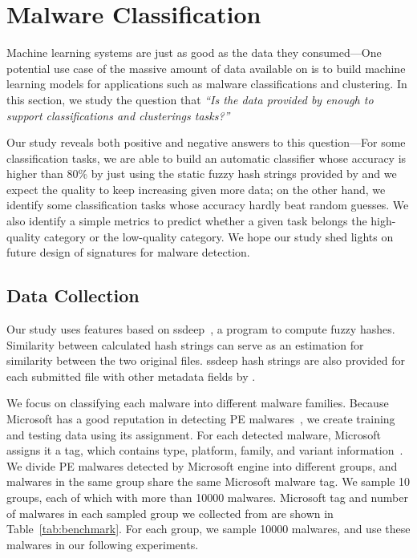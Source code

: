 \section{Malware Classification}
\label{sec:ssdeep}

Machine learning systems are just as good
as the data they consumed---One potential 
use case of the massive amount of data 
available on \vt{} is to build 
machine learning models for applications
such as malware classifications and
clustering. In this section, we study
the question that {\em ``Is the data
provided by \vt{} enough to support
classifications and clusterings tasks?''}

Our study reveals both positive and
negative answers to this question---For
some classification tasks, we are able
to build an automatic classifier whose
accuracy is higher than 80\% by just
using the static fuzzy hash strings provided by \vt{}
and we expect the quality to keep increasing
given more data; on the other hand,
we identify some classification tasks
whose accuracy hardly beat random guesses.
We also identify a simple metrics
to predict whether a given task belongs
the high-quality category or the low-quality
category. We hope our study shed lights
on future design of signatures for malware
detection.



\subsection{Data Collection}



Our study uses features based on ssdeep~\cite{ssdeep}, a program to compute fuzzy hashes. 
Similarity between calculated hash strings can serve as an estimation for similarity between the two original files. 
ssdeep hash strings are also provided for each submitted file with other metadata fields by \vt. 

We focus on classifying each malware into
different malware families. Because Microsoft 
has a good reputation in detecting PE malwares~\cite{SongAPsys2016}, 
we create training and testing
data using its assignment. For each detected malware, 
Microsoft assigns it a tag, which contains type, platform, family, 
and variant information~\cite{microsoft}. 
We divide PE malwares detected by Microsoft engine into different groups, 
and malwares in the same group share the same Microsoft malware tag. 
We sample 10 groups, each of which with more than 10000 malwares.  
Microsoft tag and number of malwares in each sampled group we collected from \vt{} 
are shown in Table~\ref{tab:benchmark}. 
For each group, we sample 10000 malwares, and use these malwares in our following experiments. 

